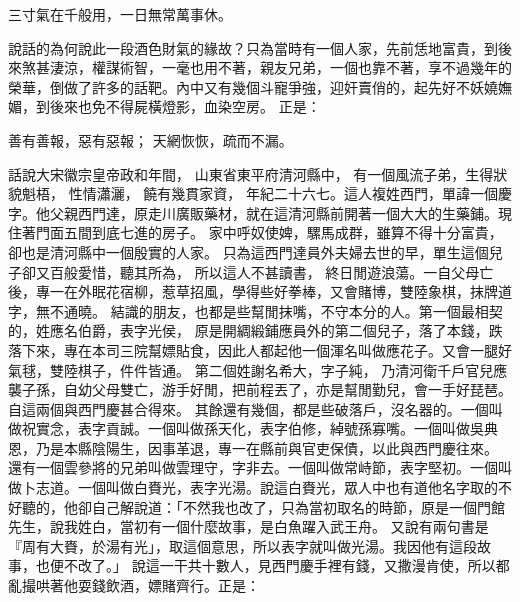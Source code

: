 三寸氣在千般用，一日無常萬事休。

說話的為何說此一段酒色財氣的緣故？只為當時有一個人家，先前恁地富貴，到後來煞甚淒涼，權謀術智，一毫也用不著，親友兄弟，一個也靠不著，享不過幾年的榮華，倒做了許多的話靶。內中又有幾個斗寵爭強，迎奸賣俏的，起先好不妖嬈嫵媚，到後來也免不得屍橫燈影，血染空房。
正是：

善有善報，惡有惡報；
天網恢恢，疏而不漏。


話說大宋徽宗皇帝政和年間，
山東省東平府清河縣中，
有一個風流子弟，生得狀貌魁梧，
性情瀟灑，
饒有幾貫家資，
年紀二十六七。這人複姓西門，單諱一個慶字。他父親西門達，原走川廣販藥材，就在這清河縣前開著一個大大的生藥鋪。現住著門面五間到底七進的房子。
家中呼奴使婢，騾馬成群，雖算不得十分富貴，
卻也是清河縣中一個殷實的人家。
只為這西門達員外夫婦去世的早，單生這個兒子卻又百般愛惜，聽其所為，
所以這人不甚讀書，
終日閒遊浪蕩。一自父母亡後，專一在外眠花宿柳，惹草招風，學得些好拳棒，又會賭博，雙陸象棋，抹牌道字，無不通曉。
結識的朋友，也都是些幫閒抹嘴，不守本分的人。第一個最相契的，姓應名伯爵，表字光侯，
原是開綢緞鋪應員外的第二個兒子，落了本錢，跌落下來，專在本司三院幫嫖貼食，因此人都起他一個渾名叫做應花子。又會一腿好氣毬，雙陸棋子，件件皆通。
第二個姓謝名希大，字子純，
乃清河衛千戶官兒應襲子孫，自幼父母雙亡，游手好閒，把前程丟了，亦是幫閒勤兒，會一手好琵琶。自這兩個與西門慶甚合得來。
其餘還有幾個，都是些破落戶，沒名器的。一個叫做祝實念，表字貢誠。一個叫做孫天化，表字伯修，綽號孫寡嘴。一個叫做吳典恩，乃是本縣陰陽生，因事革退，專一在縣前與官吏保債，以此與西門慶往來。
還有一個雲參將的兄弟叫做雲理守，字非去。一個叫做常峙節，表字堅初。一個叫做卜志道。一個叫做白賚光，表字光湯。說這白賚光，眾人中也有道他名字取的不好聽的，他卻自己解說道：「不然我也改了，只為當初取名的時節，原是一個門館先生，說我姓白，當初有一個什麼故事，是白魚躍入武王舟。
又說有兩句書是『周有大賚，於湯有光」，取這個意思，所以表字就叫做光湯。我因他有這段故事，也便不改了。」
說這一干共十數人，見西門慶手裡有錢，又撒漫肯使，所以都亂撮哄著他耍錢飲酒，嫖賭齊行。正是：

